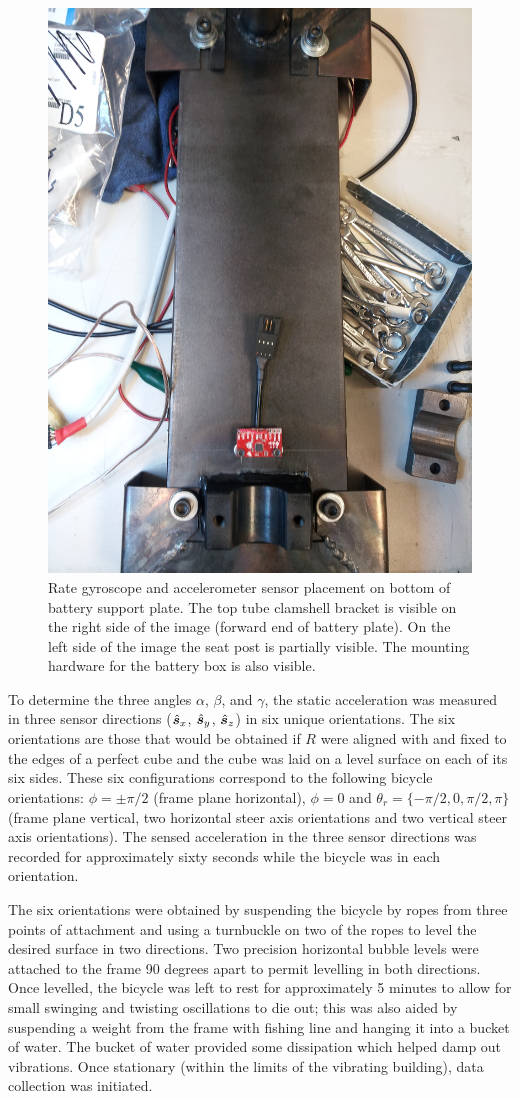 \begin{figure}[htbp]
  \centering
  \includegraphics[width=.6\textwidth,angle=90]{images/IMG_20130325_195226.jpg}
  \caption[Rate gyroscope and accelerometer sensor placement.]{Rate gyroscope
    and accelerometer sensor placement on bottom of battery support plate. The
    top tube clamshell bracket is visible on the right side of the image
    (forward end of battery plate). On the left side of the image the seat post
    is partially visible. The mounting hardware for the battery box is also
    visible.}
  \label{rb:img:imuplacement}
\end{figure}

To determine the three angles $\alpha$, $\beta$, and $\gamma$, the static
acceleration was measured in three sensor directions ($\hat{\boldsymbol{s}}_{x}$, $\hat{\boldsymbol{s}}_{y}$,
$\hat{\boldsymbol{s}}_{z}$) in six unique orientations. The six orientations are those that
would be obtained if $R$ were aligned with and fixed to the edges of a perfect
cube and the cube was laid on a level surface on each of its six sides.  These
six configurations correspond to the following bicycle orientations:
$\phi=\pm\pi/2$ (frame plane horizontal), $\phi=0$ and $\theta_r = \{-\pi/2, 0,
\pi/2, \pi\}$ (frame plane vertical, two horizontal steer axis orientations and
two vertical steer axis orientations). The sensed acceleration in the three sensor
directions was recorded for approximately sixty seconds while the bicycle was
in each orientation.

The six orientations were obtained by suspending the bicycle by ropes from
three points of attachment and using a turnbuckle on two of the ropes to level
the desired surface in two directions. Two precision horizontal bubble levels
were attached to the frame 90 degrees apart to permit levelling in both
directions.  Once levelled, the bicycle was left to rest for approximately 5
minutes to allow for small swinging and twisting oscillations to die out; this
was also aided by suspending a weight from the frame with fishing line and
hanging it into a bucket of water. The bucket of water provided some
dissipation which helped damp out vibrations. Once stationary (within the
limits of the vibrating building), data collection was initiated.

